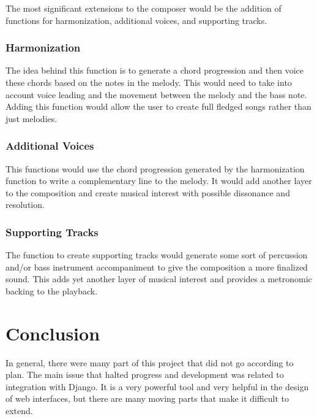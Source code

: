 The most significant extensions to the composer would be the addition of functions for harmonization, additional voices, and supporting tracks.

\subsubsection{Harmonization}
\label{subsubsec:harmonization}

The idea behind this function is to generate a chord progression and then voice these chords based on the notes in the melody.  This would need to take into account voice leading and the movement between the melody and the bass note.  Adding this function would allow the user to create full fledged songs rather than just melodies.

\subsubsection{Additional Voices}
\label{subsubsec:additionalvoices}

This functions would use the chord progression generated by the harmonization function to write a complementary line to the melody.  It would add another layer to the composition and create musical interest with possible dissonance and resolution.

\subsubsection{Supporting Tracks}
\label{subsubsec:supportingtracks}

The function to create supporting tracks would generate some sort of percussion and/or bass instrument accompaniment to give the composition a more finalized sound.  This adds yet another layer of musical interest and provides a metronomic backing to the playback.

\section{Conclusion}
\label{conclusion}

In general, there were many part of this project that did not go according to plan.  The main issue that halted progress and development was related to integration with Django.  It is a very powerful tool and very helpful in the design of web interfaces, but there are many moving parts that make it difficult to extend.

\vspace{\baselineskip}

